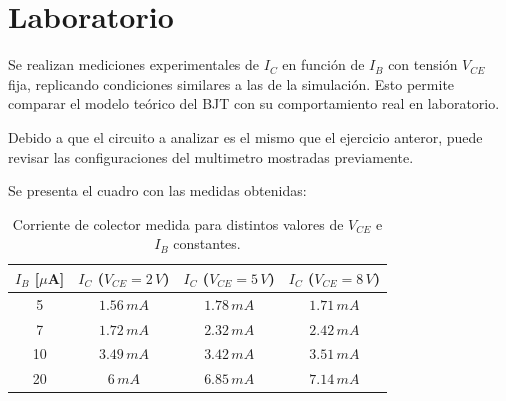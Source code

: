   \section{Laboratorio}

    Se realizan mediciones experimentales de $I_C$ en función de $I_B$ con tensión $V_{CE}$ fija, replicando condiciones
    similares a las de la simulación. Esto permite comparar el modelo teórico del BJT con su comportamiento real en
    laboratorio.

    Debido a que el circuito a analizar es el mismo que el ejercicio anteror, puede revisar las configuraciones del
    multimetro mostradas previamente.

    Se presenta el cuadro con las medidas obtenidas:

    \begin{table}[h!]
      \centering
      \begin{tabular}{|c|c|c|c|}
        \hline
        $I_B$ [$\mu$A] & $I_C$ ($V_{CE} = 2\,V$) & $I_C$ ($V_{CE} = 5\,V$) & $I_C$ ($V_{CE} = 8\,V$) \\ \hline
        5  & $1.56 \, mA$ & $1.78 \, mA$  & $1.71 \, mA$ \\ \hline
        7  & $1.72 \, mA$ & $2.32 \, mA$  & $2.42 \, mA$ \\ \hline
        10 & $3.49 \, mA$ & $3.42 \, mA$  & $3.51 \, mA$ \\ \hline
        20 & $6 \, mA$    & $6.85 \, mA$  & $7.14 \, mA$ \\ \hline
      \end{tabular}
      \caption{Corriente de colector medida para distintos valores de $V_{CE}$ e $I_B$ constantes.}
    \end{table}
    
